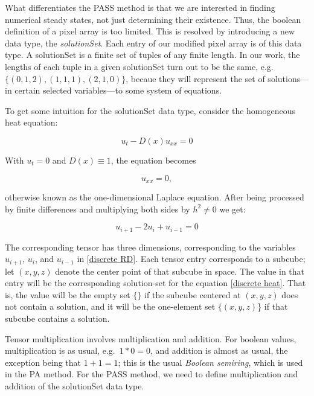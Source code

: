 \documentclass[11pt]{article}
\begin{document}
What differentiates the PASS method is that we are interested in finding numerical steady states, not just determining their existence. Thus, the boolean definition of a pixel array is too limited. This is resolved by introducing a new data type, the \textit{solutionSet}. Each entry of our modified pixel array is of this data type. A solutionSet is a finite set of tuples of any finite length. In our work, the lengths of each tuple in a given solutionSet turn out to be the same, e.g.\  $\{(0,1,2), (1,1,1), (2,1,0)\}$, becaue they will represent the set of solutions---in certain selected variables---to some system of equations.

To get some intuition for the solutionSet data type, consider the homogeneous heat equation:

\begin{equation}
    \label{general homogeneous heat}
    u_t - D(x)u_{xx} = 0
\end{equation}

\noindent With $u_t = 0$ and $D(x) \equiv 1$, the equation becomes

\begin{equation}
    \label{homogeneous heat}
    u_{xx} = 0,
\end{equation}

\noindent otherwise known as the one-dimensional Laplace equation. After being processed by finite differences and multiplying both sides by $h^2 \ne 0$ we get: 

\begin{equation}
    \label{discrete heat}
    u_{i+1} - 2u_i + u_{i-1} = 0
\end{equation}

\noindent The corresponding tensor has three dimensions, corresponding to the variables $u_{i+1}$, $u_i$, and $u_{i-1}$ in \cref{discrete RD}. Each tensor entry corresponds to a subcube; let $(x,y,z)$ denote the center point of that subcube in space. The value in that entry will be the corresponding solution-set for the equation \cref{discrete heat}. That is, the value will be the empty set $\{\}$ if the subcube centered at $(x,y,z)$ does not contain a solution, and it will be the one-element set $\{(x,y,z)$\} if that subcube contains a solution.

Tensor multiplication involves multiplication and addition. For boolean values, multiplication is as usual, e.g.\ $1*0=0$, and addition is almost as usual, the exception being that $1+1=1$; this is the usual \emph{Boolean semiring}, which is used in the PA method. For the PASS method, we need to define multiplication and addition of the solutionSet data type.
\end{document}
